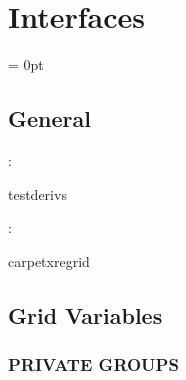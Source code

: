 
\section{Interfaces} 


\parskip = 0pt

\vspace{3mm} \subsection*{General}

: 

testderivs
\vspace{2mm}

: 

carpetxregrid
\vspace{2mm}
\subsection*{Grid Variables}
\vspace{5mm}\subsubsection{PRIVATE GROUPS}

\vspace{5mm}

